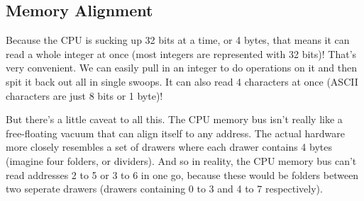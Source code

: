 \documentclass[12pt]{article}
\begin{document}
\subsection*{Memory Alignment}

Because the CPU is sucking up 32 bits at a time, or 4 bytes, that means it can read a whole integer at once (most integers are represented with 32 bits)! That's very convenient. We can easily pull in an integer to do operations on it and then spit it back out all in single swoops. It can also read 4 characters at once (ASCII characters are just 8 bits or 1 byte)!

But there's a little caveat to all this. The CPU memory bus isn't really like a free-floating vacuum that can align itself to any address. The actual hardware more closely resembles a set of drawers where each drawer contains 4 bytes (imagine four folders, or dividers). And so in reality, the CPU memory bus can't read addresses 2 to 5 or 3 to 6 in one go, because these would be folders between two seperate drawers (drawers containing 0 to 3 and 4 to 7 respectively).
\end{document}

